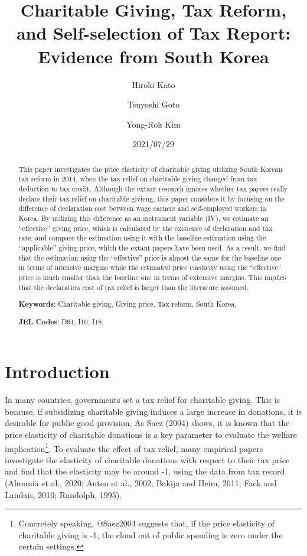 \documentclass[
  11pt,
  a4paper,
]{article}
\title{Charitable Giving, Tax Reform, and Self-selection of Tax Report: Evidence from South Korea}
\author[]{Hiroki Kato}
\affil{Graduate School of Economics, Osaka University, Japan \thanks{vge008kh@stundent.econ.osaka-u.ac.jp}}
\author[]{Tsuyoshi Goto}
\affil{Graduate School of Social Sciences, Chiba University, Japan}
\author[]{Yong-Rok Kim}
\affil{Graduate School of Economics, Kobe University, Japan}
\date{2021/07/29}
\begin{document}
\begin{spacing}{1}
  \maketitle
\end{spacing}
\begin{spacing}{1}
  \begin{abstract}
    This paper investigates the price elasticity of charitable giving utilizing South Korean tax reform in 2014, when the tax relief on charitable giving changed from tax deduction to tax credit. Although the extant research ignores whether tax payers really declare their tax relief on charitable givieng, this paper considers it by focusing on the difference of declaration cost between wage earners and self-employed workers in Korea. By utilizing this difference as an instrument variable (IV), we estimate an ``effective'' giving price, which is calculated by the existence of declaration and tax rate, and compare the estimation using it with the baseline estimation using the ``applicable'' giving price, which the extant papers have been used. As a result, we find that the estimation using the ``effective'' price is almost the same for the baseline one in terms of intensive margins while the estimated price elasticity using the ``effective'' price is much smaller than the baseline one in terms of extensive margins. This implies that the declaration cost of tax relief is larger than the literature assumed.
    
            \noindent
    \textbf{Keywords}: Charitable giving, Giving price, Tax reform, South Korea, 
        
        \noindent
    \textbf{JEL Codes}: D91, I10, I18, 
        
  \end{abstract}
\end{spacing}

\hypertarget{introduction}{%
\section{Introduction}\label{introduction}}

In many countries, governments set a tax relief for charitable giving. This is because, if subsidizing charitable giving induces a large increase in donations, it is desirable for public good provision. As Saez (2004) shows, it is known that the price elasticity of charitable donations is a key parameter to evaluate the welfare implication\footnote{Concretely speaking, @Saez2004 suggests that, if the price elasticity of charitable giving is -1, the cloud out of public spending is zero under the certain settings.}. To evaluate the effect of tax relief, many empirical papers investigate the elasticity of charitable donations with respect to their tax price and find that the elasticity may be around -1, using the data from tax record (Almunia et al., 2020; Auten et al., 2002; Bakija and Heim, 2011; Fack and Landais, 2010; Randolph, 1995).
\end{document}
